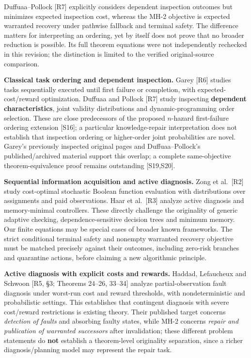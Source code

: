 \documentclass[
  10pt,
  american,
  a4paper,
]{article}
\begin{document}
Duffuaa--Pollock {[}R7{]} explicitly considers dependent inspection
outcomes but minimizes expected inspection cost, whereas the MH-2
objective is expected warranted recovery under pathwise fallback and
terminal safety. The difference matters for interpreting an ordering,
yet by itself does not prove that no broader reduction is possible. Its
full theorem equations were not independently rechecked in this
revision; the distinction is limited to the verified original-source
comparison.

\textbf{Classical task ordering and dependent inspection.} Garey
{[}R6{]} studies tasks sequentially executed until first failure or
completion, with expected-cost/reward optimization. Duffuaa and Pollock
{[}R7{]} study inspecting \textbf{dependent characteristics}, joint
validity distributions and dynamic-programming order selection. These
are close predecessors of the proposed \(n\)-hazard first-failure
ordering extension {[}S16{]}; a particular knowledge-repair
interpretation does not establish that inspection ordering or
higher-order joint probabilities are novel. Garey's previously inspected
original pages and Duffuaa--Pollock's published/archived material
support this overlap; a complete same-objective theorem-equivalence
proof remains outstanding {[}S19,S20{]}.

\textbf{Sequential information acquisition and active diagnosis.} Zong
et al.~{[}R2{]} study cost-optimal stochastic Boolean function
evaluation with distributions over assignments and paid observations.
Haar et al.~{[}R3{]} analyze active diagnosis and memory-minimal
controllers. These directly challenge the originality of generic
adaptive checking, dependence-sensitive decision trees and minimum
memory. Our finite equations may be special cases of broader known
frameworks. The strict conditional terminal safety and nonempty
warranted recovery objective must be matched precisely against their
outcomes, including zero-risk branches and quarantine actions, before
claiming a new algorithmic principle.

\textbf{Active diagnosis with explicit costs and rewards.} Haddad,
Lefaucheux and Schwoon {[}R5, §3; Theorems 24--26, 33--34{]} analyze
partial-observation fault diagnosis under worst-run cost and reward
thresholds, with nondeterministic and probabilistic settings. This
establishes that contingent diagnosis with severe cost/reward
restrictions is existing theory. Their published target concerns
\emph{detection of faults} and absorbing faulty states, while MH-2
concerns \emph{repair and publication of warranted successors} after
invalidation; these different problem statements do \textbf{not}
establish a theorem-level originality separation, since a richer
diagnosis/planning model may represent the repair task.
\end{document}
